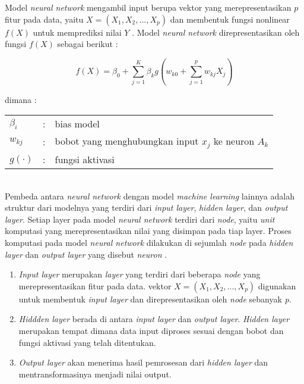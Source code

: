 \documentclass[a4paper,12pt]{report}
\begin{document}
Model \textit{neural network} mengambil input berupa vektor yang merepresentasikan $p$ fitur pada data, yaitu $X = (X_{1}, X_{2}, ..., X_{p})$ dan membentuk fungsi nonlinear $f(X)$ untuk memprediksi nilai $Y$ \cite{sohilIntroductionStatisticalLearning2022}. 
Model \textit{neural network} direpresentasikan oleh fungsi $f(X)$ sebagai berikut :

\begin{equation}
	f(X) = \beta_{0} + \sum\limits_{j=1}^{K}\beta_{k}g\left(w_{k0} + \sum\limits_{j=1}^{p}w_{kj}X_{j}\right)
	\label{modelNN}
\end{equation}

\noindent dimana : \\
\begin{tabular}{l c l}
	$\beta_i$ &:& bias model \\
	$w_{kj}$ &:& bobot yang menghubungkan input $x_j$ ke neuron $A_k$ \\
	$g(\cdot)$ &:& fungsi aktivasi
\end{tabular} \\

Pembeda antara \textit{neural network} dengan model \textit{machine learning} lainnya adalah struktur dari modelnya yang terdiri dari \textit{input layer}, \textit{hidden layer}, dan \textit{output layer}. Setiap layer pada model \textit{neural network} terdiri dari \textit{node}, yaitu \textit{unit} komputasi yang merepresentasikan nilai yang disimpan pada tiap layer. Proses komputasi pada model \textit{neural network} dilakukan di sejumlah \textit{node} pada \textit{hidden layer} dan \textit{output layer} yang disebut \textit{neuron} \cite{sohilIntroductionStatisticalLearning2022}\cite{qamarArtificialNeuralNetworks2023}. 
\begin{enumerate}
	\item \textit{Input layer} merupakan \textit{layer} yang terdiri dari beberapa \textit{node} yang merepresentasikan fitur pada data. vektor $X = (X_{1}, X_{2}, ..., X_{p})$ digunakan untuk membentuk \textit{input layer} dan direpresentasikan oleh \textit{node} sebanyak \textit{p}. 
	\item \textit{Hiddden layer} berada di antara \textit{input layer} dan \textit{output layer}. \textit{Hidden layer} merupakan tempat dimana data input diproses sesuai dengan bobot dan fungsi aktivasi yang telah ditentukan.
	\item  \textit{Output layer} akan menerima hasil pemrosesan dari \textit{hidden layer} dan mentransformasinya menjadi nilai output.
\end{enumerate}
\end{document}
